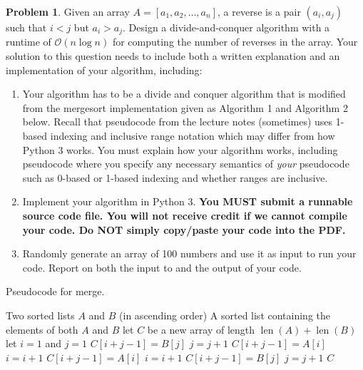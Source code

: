\documentclass[11pt]{article}
\DeclareMathOperator{\len}{len}
\theoremstyle{definition}
\theoremstyle{definition}
\newtheorem{problem}{Problem}
\theoremstyle{definition}
\begin{document}
\newpage
\begin{problem}\label{4} 
Given an array $A = [a_1, a_2, \dotsc, a_n]$, a reverse is a pair $(a_i, a_j)$ such  that $i< j$ but $a_i > a_j$. Design a divide-and-conquer algorithm with a runtime of $\mathcal{O}(n\log n)$ for computing the number of reverses in the array. Your solution to this question needs to include both a written explanation and an implementation of your algorithm, including:
\begin{enumerate}
\item\label{qs:a} Your algorithm has to be a divide and conquer algorithm that is modified from the mergesort implementation given as Algorithm 1 and Algorithm 2 below. Recall that pseudocode from the lecture notes (sometimes) uses 1-based indexing and inclusive range notation which may differ from how Python 3 works. You must explain how your algorithm works, including pseudocode where you specify any necessary semantics of \emph{your} pseudocode such as 0-based or 1-based indexing and whether ranges are inclusive. 
\item\label{qs:b} Implement your algorithm in Python 3. \textbf{You MUST submit a runnable source code file. You will not receive credit if we cannot compile your code. Do NOT simply copy/paste your code into the PDF. }
\item\label{qs:c} Randomly generate an array of 100 numbers and use it as input to run your code. Report on both the input to and the output of your code.
\end{enumerate}
\end{problem}

\clearpage
\begin{algorithm}[H]
    \caption{Pseudocode for merge.\label{alg:merge}}
    \begin{algorithmic}[1]
       \Input Two sorted lists $A$ and $B$ (in ascending order)
       \Output A sorted list containing the elements of both $A$ and $B$
         \State let $C$ be a new array of length $\len(A)+\len(B)$
         \State let $i=1$ and $j=1$
         \While{$i+j \le \len(A) + \len(B)$}
            \If{$i > \len(A)$} 
               \State $C[i+j-1] = B[j]$
               \State $j=j+1$
            \ElsIf{$j > \len(B)$} 
               \State $C[i+j-1] = A[i]$
               \State $i=i+1$
               \State $C[i+j-1] = A[i]$
               \State $i=i+1$
            \Else 
               \State $C[i+j-1] = B[j]$
               \State $j=j+1$
            \EndIf
         \EndWhile
         \State\Return $C$
       \EndProcedure
    \end{algorithmic}
 \end{algorithm}
\end{document}
